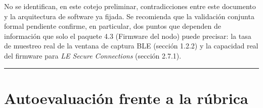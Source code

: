 \documentclass[11pt,a4paper]{article}
\begin{document}
No se identifican, en este cotejo preliminar, contradicciones entre este documento y la arquitectura de software ya fijada. Se recomienda que la validación conjunta formal pendiente confirme, en particular, dos puntos que dependen de información que solo el paquete 4.3 (Firmware del nodo) puede precisar: la tasa de muestreo real de la ventana de captura BLE (sección 1.2.2) y la capacidad real del firmware para \emph{LE Secure Connections} (sección 2.7.1).

\begin{center}\rule{0.5\linewidth}{0.5pt}\end{center}

\section{Autoevaluación frente a la rúbrica}\label{autoevaluaciuxf3n-frente-a-la-ruxfabrica}
\end{document}
